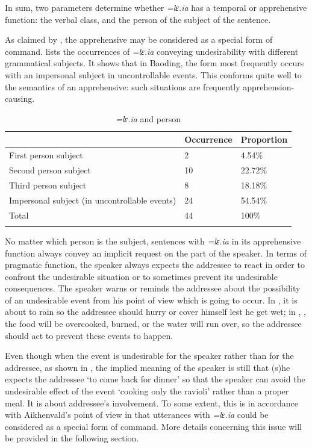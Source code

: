 \documentclass[output=paper,colorlinks,citecolor=brown, language=chinese]{langscibook}
\begin{document}
In sum, two parameters determine whether \textit{=lɛ.ia} has a temporal or apprehensive function: the verbal class, and the person of the subject of the sentence.


As claimed by \citet[225--226]{Aikhenvald2010}, the apprehensive may be considered as a special form of command.  lists the occurrences of \textit{=lɛ.ia} conveying undesirability  with different grammatical subjects. It shows that in Baoding, the form most frequently occurs with an  impersonal subject in uncontrollable events. This conforms quite well to the semantics of an apprehensive: such situations are frequently apprehension-causing.


\begin{table}
\begin{tabularx}{\textwidth}{l YY}
\lsptoprule
 & Occurrence & Proportion \\
\midrule
First person subject                      & 2  & 4.54\%   \\
Second person subject                     & 10 & 22.72\%  \\
Third person subject                      & 8  & 18.18\%  \\
Impersonal subject (in uncontrollable events) & 24 & 54.54\%  \\
\midrule
Total                                     & 44 & 100\%    \\
\lspbottomrule
\end{tabularx}
\caption{\textit{=lɛ.ia} and person}
\label{tab:song:4}
\end{table}


No matter which person is the subject, sentences with \textit{=lɛ.ia} in its apprehensive function always convey an implicit request on the part of the speaker. In terms of pragmatic function, the speaker always expects the addressee to react in order to confront the undesirable situation or to sometimes prevent its undesirable consequences. The speaker warns or reminds the addressee about the possibility of an undesirable event from his point of view which is going to occur. In , it is about to rain so the addressee should hurry or cover himself lest he get wet; in , ,  the food will be overcooked, burned, or the water will run over, so the addressee should act to prevent these events to happen.

Even though when the event is undesirable for the speaker rather than for the addressee, as shown in , the implied meaning of the speaker is still that (s)he expects the addressee `to come back for dinner' so that the speaker can avoid the undesirable effect of the event `cooking only the ravioli' rather than a proper meal. It is about addressee's involvement. To some extent, this is in accordance with Aikhenvald's point of view in that utterances with \textit{=lɛ.ia} could be considered as a special form of command. More details concerning this issue will be provided in the following section.
\end{document}
